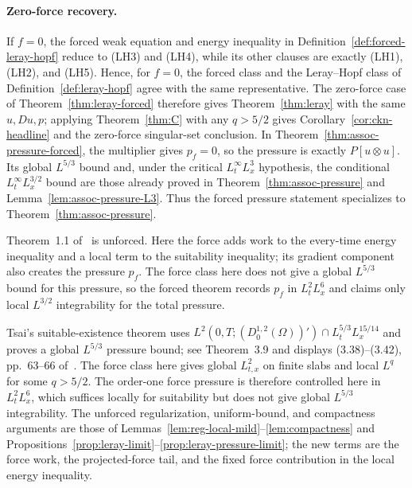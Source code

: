 \documentclass[11pt,reqno]{amsart}
\begin{document}
\paragraph{Zero-force recovery.}
If $f=0$, the forced weak equation and energy inequality in
Definition~\ref{def:forced-leray-hopf} reduce to (LH3) and (LH4), while its
other clauses are exactly (LH1), (LH2), and (LH5). Hence, for $f=0$, the forced
class and the Leray--Hopf class of Definition~\ref{def:leray-hopf} agree with
the same representative. The
zero-force case of Theorem~\ref{thm:leray-forced} therefore gives
Theorem~\ref{thm:leray} with the same $u,Du,p$; applying Theorem~\ref{thm:C} with any
$q>5/2$ gives Corollary~\ref{cor:ckn-headline} and the zero-force
singular-set conclusion. In Theorem~\ref{thm:assoc-pressure-forced}, the
multiplier gives $p_f=0$, so the pressure is exactly
$P[u\otimes u]$. Its global $L^{5/3}$ bound and, under the critical
$L^\infty_tL^3_x$ hypothesis, the conditional
$L^\infty_tL^{3/2}_x$ bound are those already proved in
Theorem~\ref{thm:assoc-pressure} and Lemma~\ref{lem:assoc-pressure-L3}.
Thus the forced pressure statement specializes to
Theorem~\ref{thm:assoc-pressure}.

\begin{remark}
Theorem~1.1 of~\cite[printed p.~212]{ESS2003} is unforced. Here the force
adds work to the every-time energy inequality and a local term to the
suitability inequality; its gradient component also creates the pressure
$p_f$. The force class here does not give a global $L^{5/3}$ bound for this
pressure, so the forced theorem records $p_f$ in $L^2_tL^6_x$ and claims
only local $L^{3/2}$ integrability for the total pressure.

Tsai's suitable-existence theorem uses
$L^2(0,T;(D^{1,2}_0(\Omega))')\cap L^{5/3}_tL^{15/14}_x$ and proves a
global $L^{5/3}$ pressure bound; see Theorem~3.9 and displays
(3.38)--(3.42), pp.~63--66 of~\cite{Tsai2018}. The force class here gives global
$L^2_{t,x}$ on finite slabs and local $L^q$ for some $q>5/2$. The
order-one force pressure is therefore controlled here in $L^2_tL^6_x$,
which suffices locally for suitability but does not give global
$L^{5/3}$ integrability. The unforced regularization, uniform-bound, and
compactness arguments are those of
Lemmas~\ref{lem:reg-local-mild}--\ref{lem:compactness} and
Propositions~\ref{prop:leray-limit}--\ref{prop:leray-pressure-limit};
the new terms are the force work, the projected-force tail, and the fixed
force contribution in the local energy inequality.
\end{remark}
\end{document}
